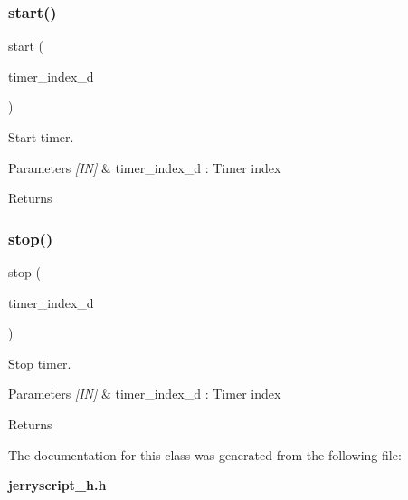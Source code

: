 \subsubsection{start()}
{\footnotesize\ttfamily start (\begin{DoxyParamCaption}\item[{timer\+\_\+index\+\_\+d}]{ }\end{DoxyParamCaption})}



Start timer. 


\begin{DoxyCode}{0}
\DoxyCodeLine{\{}
\DoxyCodeLine{\}}
\end{DoxyCode}



\begin{DoxyParams}{Parameters}
{\em \mbox{[}\+I\+N\mbox{]}} & timer\+\_\+index\+\_\+d \+: Timer index \\
\hline
\end{DoxyParams}
\begin{DoxyReturn}{Returns}

\end{DoxyReturn}
\mbox{\label{classtimer_a57555d6d2f7c6a655fed83481e1dbaee}} 
\subsubsection{stop()}
{\footnotesize\ttfamily stop (\begin{DoxyParamCaption}\item[{timer\+\_\+index\+\_\+d}]{ }\end{DoxyParamCaption})}



Stop timer. 


\begin{DoxyCode}{0}
\DoxyCodeLine{\{}
\DoxyCodeLine{\}}
\end{DoxyCode}



\begin{DoxyParams}{Parameters}
{\em \mbox{[}\+I\+N\mbox{]}} & timer\+\_\+index\+\_\+d \+: Timer index \\
\hline
\end{DoxyParams}
\begin{DoxyReturn}{Returns}

\end{DoxyReturn}


The documentation for this class was generated from the following file\+:\begin{DoxyCompactItemize}
\item 
\textbf{ jerryscript\+\_\+h.\+h}\end{DoxyCompactItemize}
